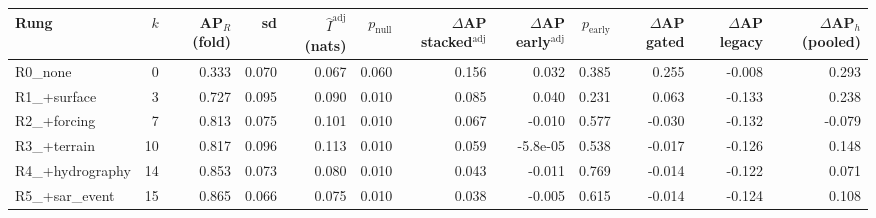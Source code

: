 \begin{tabular}{lrrrrrrrrrrr}
\toprule
Rung & $k$ & AP$_R$ (fold) & sd & $\hat I^{\mathrm{adj}}$ (nats) & $p_{\mathrm{null}}$ & $\Delta$AP stacked$^{\mathrm{adj}}$ & $\Delta$AP early$^{\mathrm{adj}}$ & $p_{\mathrm{early}}$ & $\Delta$AP gated & $\Delta$AP legacy & $\Delta$AP$_h$ (pooled) \\
\midrule
R0\_none & 0 & 0.333 & 0.070 & 0.067 & 0.060 & 0.156 & 0.032 & 0.385 & 0.255 & -0.008 & 0.293 \\
R1\_+surface & 3 & 0.727 & 0.095 & 0.090 & 0.010 & 0.085 & 0.040 & 0.231 & 0.063 & -0.133 & 0.238 \\
R2\_+forcing & 7 & 0.813 & 0.075 & 0.101 & 0.010 & 0.067 & -0.010 & 0.577 & -0.030 & -0.132 & -0.079 \\
R3\_+terrain & 10 & 0.817 & 0.096 & 0.113 & 0.010 & 0.059 & -5.8e-05 & 0.538 & -0.017 & -0.126 & 0.148 \\
R4\_+hydrography & 14 & 0.853 & 0.073 & 0.080 & 0.010 & 0.043 & -0.011 & 0.769 & -0.014 & -0.122 & 0.071 \\
R5\_+sar\_event & 15 & 0.865 & 0.066 & 0.075 & 0.010 & 0.038 & -0.005 & 0.615 & -0.014 & -0.124 & 0.108 \\
\bottomrule
\end{tabular}
